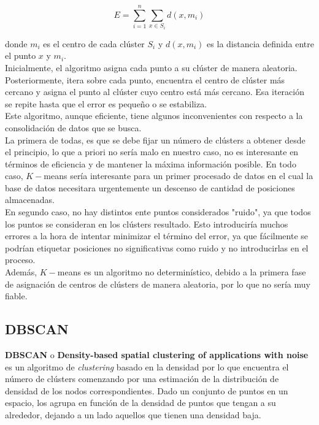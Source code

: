\documentclass[a4paper, 12pt]{article}
\begin{document}
$$ E=\sum_{i=1}^{n} \sum_{x\in S_i} d(x, m_i) $$

donde $m_i$ es el centro de cada cl\'uster $S_i$ y $d(x, m_i)$ es la distancia definida entre el punto $x$ y $m_i$.\\

Inicialmente, el algoritmo asigna cada punto a su cl\'uster de manera aleatoria. Posteriormente, itera sobre cada punto, encuentra el centro de cl\'uster m\'as cercano y asigna el punto al cl\'uster cuyo centro est\'a m\'as cercano. Esa iteraci\'on se repite hasta que el error es peque\~no o se estabiliza.\\

Este algoritmo, aunque eficiente, tiene algunos inconvenientes con respecto a la consolidaci\'on de datos que se busca.\\

La primera de todas, es que se debe fijar un n\'umero de cl\'usters a obtener desde el principio, lo que a priori no ser\'ia malo en nuestro caso, no es interesante en t\'erminos de eficiencia y de mantener la m\'axima informaci\'on posible. En todo caso, $K-$means ser\'ia interesante para un primer procesado de datos en el cual la base de datos necesitara urgentemente un descenso de cantidad de posiciones almacenadas. \\

En segundo caso, no hay distintos ente puntos considerados "ruido", ya que todos los puntos se consideran en los cl\'usters resultado. Esto introducir\'ia muchos errores a la hora de intentar minimizar el t\'ermino del error, ya que f\'acilmente se podr\'ian etiquetar posiciones no significativas como ruido y no introducirlas en el proceso.\\

Adem\'as, $K-$means es un algoritmo no determin\'istico, debido a la primera fase de asignaci\'on de centros de cl\'usters de manera aleatoria, por lo que no ser\'ia muy fiable.\\


\subsection{DBSCAN}
\textbf{DBSCAN}\cite{importantPlaces} o \textbf{Density-based spatial clustering of applications with noise} es un algoritmo de \textit{clustering} basado en la densidad por lo que encuentra el n\'umero de cl\'usters comenzando por una estimaci\'on de la distribuci\'on de densidad de los nodos correspondientes. Dado un conjunto de puntos en un espacio, los agrupa en funci\'on de la densidad de puntos que tengan a su alrededor, dejando a un lado aquellos que tienen una densidad baja. \\
\end{document}
